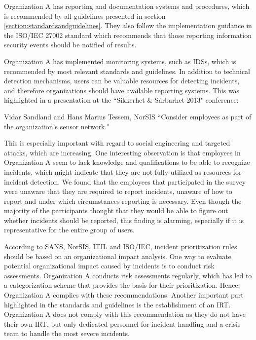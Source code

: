 Organization A has reporting and documentation systems and procedures, which is recommended by all guidelines presented in section \ref{section:standardsandguidelines}. They also follow the implementation guidance in the ISO/IEC 27002 standard which recommends that those reporting information security events should be notified of results. 

Organization  A has implemented monitoring systems, such as IDSs, which is recommended by most relevant standards and guidelines. In addition to technical detection mechanisms, users can be valuable resources for detecting incidents, and therefore organizations should have available reporting systems. This was highlighted in a presentation at the ``Sikkerhet \& S\aa rbarhet 2013" conference:

\begin{newquote}{Vidar Sandland and Hans Marius Tessem, NorSIS}
``Consider employees as part of the organization's sensor network."
\end{newquote}

This is especially important with regard to social engineering and targeted attacks, which are increasing. One interesting observation is that employees in Organization A seem to lack knowledge and qualifications to be able to recognize incidents, which might indicate that they are not fully utilized as resources for incident detection. We found that the employees that participated in the survey were unaware that they are required to report incidents, unaware of how to report and under which circumstances reporting is necessary. Even though the majority of the participants thought that they would be able to figure out whether incidents should be reported, this finding is alarming, especially if it is representative for the entire group of users. 

According to SANS, NorSIS, ITIL and ISO/IEC, incident prioritization rules should be based on an organizational impact analysis. One way to evaluate potential organizational impact caused by incidents is to conduct risk assessments. Organization A conducts risk assessments regularly, which has led to a categorization scheme that provides the basis for their prioritization. Hence, Organization A complies with these recommendations. Another important part highlighted in the standards and guidelines is the establishment of an \ac{IRT}. Organization A does not comply with this recommendation as they do not have their own \ac{IRT}, but only dedicated personnel for incident handling and a crisis team to handle the most severe incidents.

